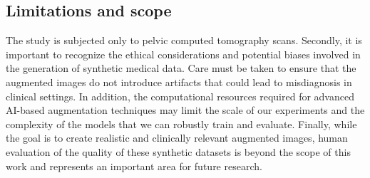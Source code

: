 \subsection{Limitations and scope}
The study is subjected only to pelvic computed tomography scans.  
Secondly, it is important to recognize the ethical considerations and potential biases involved in the generation of synthetic medical data. Care must be taken to ensure that the augmented images do not introduce artifacts that could lead to misdiagnosis in clinical settings. In addition, the computational resources required for advanced AI-based augmentation techniques may limit the scale of our experiments and the complexity of the models that we can robustly train and evaluate. 
Finally, while the goal is to create realistic and clinically relevant augmented images, human evaluation of the quality of these synthetic datasets is beyond the scope of this work and represents an important area for future research.
